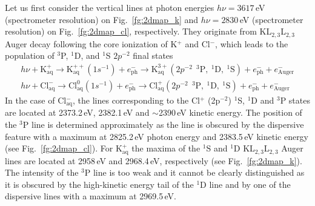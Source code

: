 Let us first consider the vertical lines at photon energies $h\nu = 3617$\,eV {\color{red}(spectrometer resolution)} on Fig.\ \ref{fg:2dmap_k} and $h\nu = 2830$\,eV {\color{red}(spectrometer resolution)} on Fig.\ \ref{fg:2dmap_cl}, respectively. They originate from KL$_{2,3}$L$_{2,3}$ Auger decay following the core ionization of K$^+$ and Cl$^-$, which leads to the population of $^3$P, $^1$D, and $^1$S $2p^{-2}$ final states
%
\begin{align*}
h\nu + \text{K}_\text{aq}^{+} \rightarrow \text{K}_\text{aq}^{++}(1s^{-1}) + e^{-}_{\text{ph}}
			 \rightarrow \text{K}_\text{aq}^{3+} (2p^{-2}\ \ ^3\text{P},\ ^1\text{D},\ ^1\text{S}) + e^{-}_{\text{ph}} + e^{-}_{\text{Auger}} \\
h\nu + \text{Cl}_\text{aq}^{-} \rightarrow \text{Cl}_\text{aq}^{0}(1s^{-1}) + e^{-}_{\text{ph}}
			 \rightarrow \text{Cl}_\text{aq}^{+} (2p^{-2}\ \ ^3\text{P},\ ^1\text{D},\ ^1\text{S}) + e^{-}_{\text{ph}} + e^{-}_{\text{Auger}} 
\end{align*}
%
In the case of Cl$^{-}_{\text{aq}}$, the lines corresponding to the Cl$^{+}$ (2p$^{-2}$) $^1$S, $^1$D and $^3$P states are located at 2373.2\,eV, 2382.1\,eV and $\sim$2390\,eV kinetic energy. The position of the $^{3}$P line is determined approximately as the line is obscured by the dispersive feature with a maximum at 2825.2\,eV photon energy and 2383.5\,eV kinetic energy (see Fig.\ \ref{fg:2dmap_cl}). For K$^{+}_{\text{aq}}$ the maxima of the $^1$S and $^1$D KL$_{2,3}$L$_{2,3}$ Auger lines are located at 2958\,eV and 2968.4\,eV, respectively (see Fig.\ \ref{fg:2dmap_k}). The intensity of the $^3$P line is too weak and it cannot be clearly distinguished as it is obscured by the high-kinetic energy tail of the $^1$D line and by one of the dispersive lines with a maximum at 2969.5\,eV.


